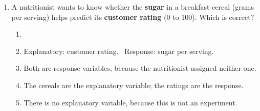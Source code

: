 \documentclass[12pt]{article}
\begin{document}
\begin{enumerate}[leftmargin=1.9em, itemsep=0.13in]
  \boxguard[9]
  \item A nutritionist wants to know whether the \textbf{sugar} in a breakfast cereal (grams per
        serving) helps predict its \textbf{customer rating} (0 to 100). Which is correct?
        \begin{enumerate}[label=\textbf{(\Alph*)}, leftmargin=2.2em, itemsep=2pt]
          \item {}
          \item Explanatory: customer rating. \ Response: sugar per serving.
          \item Both are response variables, because the nutritionist assigned neither one.
          \item The cereals are the explanatory variable; the ratings are the response.
          \item There is no explanatory variable, because this is not an experiment.\hfill{}\rule[-0.2in]{0pt}{0.48in}
        \end{enumerate}


\end{enumerate}
\end{document}
